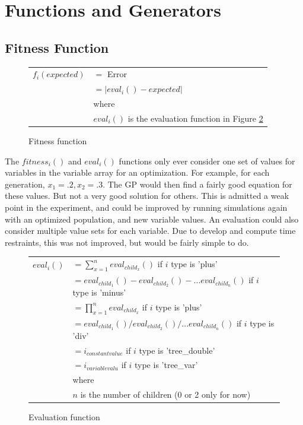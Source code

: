 \documentclass[12pt]{article}
\begin{document}
\section{Functions and Generators}
\subsection{Fitness Function}
\label{sec:fitness}
\begin{figure}[!h]
        \begin{center}
		\begin{tabular}{r l}
			$ f_i(expected) $		&	$ = $ Error \\
								&	$ = | eval_i() - expected | $ \\
								& where \\
								& $ eval_i() $ is the evaluation function in Figure \ref{eval_func}\\
		\end{tabular}
               \caption{Fitness function}
                \label{fit_func}
        \end{center}
\end{figure}

The $fitness_i()$ and $eval_i()$ functions only ever consider one set of values for variables in the variable array for an optimization. For example, for each generation, $x_1 = .2, x_2 = .3$. The GP would then find a fairly good equation for these values. But not a very good solution for others. This is admitted a weak point in the experiment, and could be improved by running simulations again with an optimized population, and new variable values. An evaluation could also consider multiple value sets for each variable. Due to develop and compute time restraints, this was not improved, but would be fairly simple to do.

\begin{figure}[!h]
        \begin{center}
		\begin{tabular}{r l}
			$ eval_i() $	&	$ = \sum_{x=1}^{n} eval_{child_x}() $	if $i$ type is 'plus'\\
						&	$ = eval_{child_1}() - eval_{child_2}() - ... eval_{child_n}()$ if $i$ type is 'minus'\\
						&	$ = \prod_{x=1}^{n} eval_{child_x} $	if $i$ type is 'plus'\\
						&	$ = eval_{child_1}() / eval_{child_2}() / ... eval_{child_n}()$ if $i$ type is 'div'\\
						&	$ = i_{constant value} $ if $i$ type is 'tree\_double' \\
						&	$ = i_{variable valu} $ if $i$ type is 'tree\_var' \\
						& where \\
						& $ n $ is the number of children (0 or 2 only for now)
		\end{tabular}
               \caption{Evaluation function}
                \label{eval_func}
        \end{center}
\end{figure}
\end{document}
